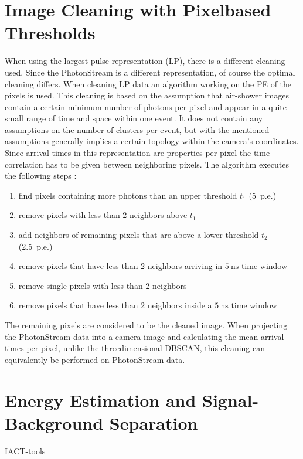 \section{Image Cleaning with Pixelbased Thresholds}
\label{sec:thresh}
%
When using the largest pulse representation (LP), there is a different cleaning
used. Since the PhotonStream is a different representation, of course the
optimal cleaning differs. When cleaning LP data an algorithm working on the PE
of the pixels is used. This cleaning is based on the assumption that air-shower
images contain a certain minimum number of photons per pixel and appear in a
quite small range of time and space within one event. It does not contain any
assumptions on the number of clusters per event, but with the mentioned
assumptions generally implies a certain topology within the camera's
coordinates. Since arrival times in this representation are properties per
pixel the time correlation has to be given between neighboring pixels. The
algorithm executes the following steps \cite{facttools}:
%
\begin{enumerate}
  \item find pixels containing more photons than an upper threshold $t_1$ (5~p.e.)
  \item remove pixels with less than 2 neighbors above $t_1$
  \item add neighbors of remaining pixels that are above a lower threshold $t_2$ (2.5~p.e.)
  \item remove pixels that have less than 2 neighbors arriving in $\SI{5}{\nano\second}$ time window
  \item remove single pixels with less than 2 neighbors
  \item remove pixels that have less than 2 neighbors inside a $\SI{5}{\nano\second}$ time window
\end{enumerate}
%
The remaining pixels are considered to be the cleaned image. When projecting
the PhotonStream data into a camera image and calculating the mean arrival
times per pixel, unlike the threedimensional DBSCAN, this cleaning can
equivalently be performed on PhotonStream data.


\section{Energy Estimation and Signal-Background Separation}
%
IACT-tools
